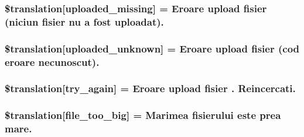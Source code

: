 \subsubsection[{\$translation}]{\setlength{\rightskip}{0pt plus 5cm}\$translation\mbox{[}\textquotesingle{}uploaded\+\_\+missing\textquotesingle{}\mbox{]} = \textquotesingle{}Eroare {\bf upload} fisier (niciun fisier nu a fost uploadat).\textquotesingle{}}\label{class_8upload_8ro___r_o_8php_a0cce433260be65f1f35853a6b4b8952b}
\hypertarget{class_8upload_8ro___r_o_8php_a4a9168e922b827e6a28b5db1c00774ca}{}
\subsubsection[{\$translation}]{\setlength{\rightskip}{0pt plus 5cm}\$translation\mbox{[}\textquotesingle{}uploaded\+\_\+unknown\textquotesingle{}\mbox{]} = \textquotesingle{}Eroare {\bf upload} fisier (cod eroare necunoscut).\textquotesingle{}}\label{class_8upload_8ro___r_o_8php_a4a9168e922b827e6a28b5db1c00774ca}
\hypertarget{class_8upload_8ro___r_o_8php_a3afc377bd803683314f413a814243066}{}
\subsubsection[{\$translation}]{\setlength{\rightskip}{0pt plus 5cm}\$translation\mbox{[}\textquotesingle{}try\+\_\+again\textquotesingle{}\mbox{]} = \textquotesingle{}Eroare {\bf upload} fisier . Reincercati.\textquotesingle{}}\label{class_8upload_8ro___r_o_8php_a3afc377bd803683314f413a814243066}
\hypertarget{class_8upload_8ro___r_o_8php_a476278eb4a0c3df56af068e2d511a741}{}
\subsubsection[{\$translation}]{\setlength{\rightskip}{0pt plus 5cm}\$translation\mbox{[}\textquotesingle{}file\+\_\+too\+\_\+big\textquotesingle{}\mbox{]} = \textquotesingle{}Marimea fisierului este prea mare.\textquotesingle{}}\label{class_8upload_8ro___r_o_8php_a476278eb4a0c3df56af068e2d511a741}
\hypertarget{class_8upload_8ro___r_o_8php_a191a55df8e3bb7f3c51b70f3c1932e02}{}
